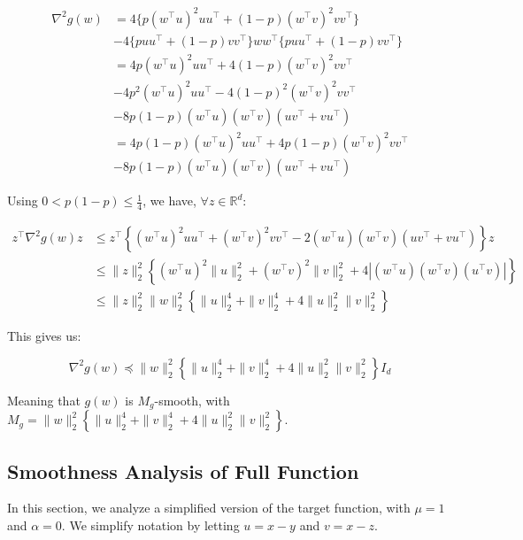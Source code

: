 \documentclass[11pt]{article}
\begin{document}
\begin{align*}
    \nabla^2 g(w) &= 
    4 \{ p(w^{\top}u)^2 uu^{\top} + (1-p)(w^{\top}v)^2 vv^{\top} \} \\
    &- 4 \{ p uu^{\top} + (1-p) vv^{\top} \}ww^{\top}\{ p uu^{\top} + (1-p) vv^{\top} \} \\
    &= 4 p(w^{\top}u)^2 uu^{\top} + 4 (1-p)(w^{\top}v)^2 vv^{\top} \\
    &- 4 p^2 (w^{\top}u)^2 uu^{\top} - 4 (1-p)^2 (w^{\top}v)^2 vv^{\top} \\
    &- 8 p (1-p) (w^{\top}u)(w^{\top}v)(uv^{\top} + vu^{\top}) \\
    &= 4 p (1 - p) (w^{\top}u)^2 uu^{\top} + 4 p (1-p) (w^{\top}v)^2 vv^{\top} \\
    &- 8 p (1-p) (w^{\top}u)(w^{\top}v)(uv^{\top} + vu^{\top})
\end{align*}

Using $0 < p(1-p) \leq \frac{1}{4}$, we have, $\forall z \in \mathbb{R}^d$:

\begin{align*}
    z^{\top} \nabla^2 g(w) z &\leq
    z^{\top} \left\{ (w^{\top}u)^2 uu^{\top} + (w^{\top}v)^2 vv^{\top} - 2 (w^{\top}u)(w^{\top}v)(uv^{\top} + vu^{\top}) \right\} z \\
    &\leq \|z\|_2^2 \left\{ (w^{\top}u)^2 \|u\|_2^2 + (w^{\top}v)^2 \|v\|_2^2 + 4 \left| (w^{\top}u)(w^{\top}v)(u^{\top}v) \right| \right\} \\
    &\leq \|z\|_2^2 \|w\|_2^2 \left\{ \|u\|_2^4 + \|v\|_2^4 + 4 \|u\|_2^2 \|v\|_2^2 \right\}
\end{align*}

This gives us:

\begin{equation}
    \nabla^2 g(w) \preceq \|w\|_2^2 \left\{ \|u\|_2^4 + \|v\|_2^4 + 4 \|u\|_2^2 \|v\|_2^2 \right\} I_d
\end{equation}

Meaning that $g(w)$ is $M_g$-smooth, with $M_g = \|w\|_2^2 \left\{ \|u\|_2^4 + \|v\|_2^4 + 4 \|u\|_2^2 \|v\|_2^2 \right\}$.

\subsection{Smoothness Analysis of Full Function}

In this section, we analyze a simplified version of the target function, with $\mu = 1$ and $\alpha = 0$. We simplify notation by letting $u = x - y$ and $v = x - z$.
\end{document}
